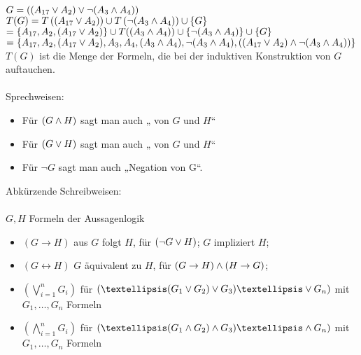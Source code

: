 \beispiel{}
$G= \left( (A_{17} \vee A_2) \vee \neg (A_3 \wedge A_4) \right)$\\
$T(G) = T \left( (A_{17} \vee A_2) \right) \cup T \left(\neg ( A_3 \wedge A_4) \right) \cup \{G\}$\\
$= \{ A_{17}, A_2, (A_{17} \vee A_2) \} \cup T((A_3 \wedge A_4)) \cup \{ \neg (A_3 \wedge A_4) \} \cup \{G\}$\\
$= \{A_{17}, A_2, (A_{17} \vee A_2), A_3, A_4, (A_3 \wedge A_4), \neg (A_3 \wedge A_4), \left( (A_{17} \vee A_2) \wedge \neg (A_3 \wedge A_4) \right) \}$\\
    
\bemerkung{}
$T(G)$ ist die Menge der Formeln, die bei der induktiven Konstruktion von $G$ auftauchen.\\
\noindent\\
Sprechweisen:
\begin{itemize}
\item Für $(G \wedge H)$ sagt man auch „ von $G$ und $H$“
\item Für $(G \vee H)$ sagt man auch „ von $G$ und $H$“
\item Für $\neg G$ sagt man auch „Negation von G“.
\end{itemize}

\vspace{1cm}
\noindent
Abkürzende Schreibweisen:\\
\noindent\\
$G, H$ Formeln der Aussagenlogik
\begin{itemize}
\item $(G \rightarrow H)$ aus $G$ folgt $H$, für $(\neg G \vee H)$; $G$ impliziert $H$; 
\item $(G \leftrightarrow H)$ $G$ äquivalent zu $H$, für $(G \rightarrow H) \wedge (H \rightarrow G)$; 
\item $( \bigvee_{i=1}^{n} G_i )$ für $\left( … (G_1 \OR G_2) \OR G_3 ) … \OR G_n \right)$ \hspace{1cm}mit $G_1, …, G_n$ Formeln
\item $( \bigwedge_{i=1}^n G_i )$ für $\left(… ( G_1 \AND G_2) \AND G_3) … \AND G_n \right)$ \hspace{1cm}mit $G_1, …, G_n$ Formeln
\end{itemize}

